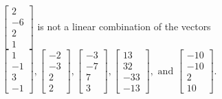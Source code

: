 \begin{exercise}
\begin{exerciseStatement}
  \end{exerciseStatement}
  \begin{exerciseAnswer}
   \(\left[\begin{array}{c}
2 \\
-6 \\
2 \\
1
\end{array}\right]\) 
  	 is not  
	a linear combination of the vectors \(\left[\begin{array}{c}
1 \\
-1 \\
3 \\
-1
\end{array}\right] , \left[\begin{array}{c}
-2 \\
-3 \\
2 \\
2
\end{array}\right] , \left[\begin{array}{c}
-3 \\
-7 \\
7 \\
3
\end{array}\right] , \left[\begin{array}{c}
13 \\
32 \\
-33 \\
-13
\end{array}\right] , \text{ and } \left[\begin{array}{c}
-10 \\
-10 \\
2 \\
10
\end{array}\right]\).

	
  


  \end{exerciseAnswer}
\end{exercise}
